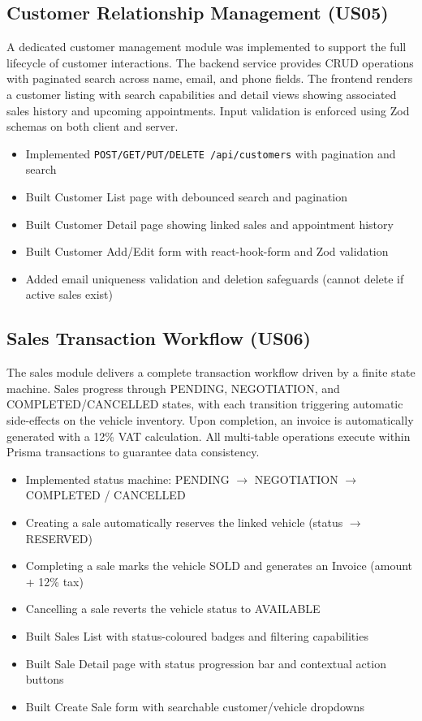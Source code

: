 \documentclass[12pt,a4paper]{article}
\begin{document}
\subsection{Customer Relationship Management (US05)}

A dedicated customer management module was implemented to support the full lifecycle of customer interactions. The backend service provides CRUD operations with paginated search across name, email, and phone fields. The frontend renders a customer listing with search capabilities and detail views showing associated sales history and upcoming appointments. Input validation is enforced using Zod schemas on both client and server.

\begin{itemize}[leftmargin=1.5em, itemsep=4pt]
  \item Implemented \texttt{POST/GET/PUT/DELETE /api/customers} with pagination and search
  \item Built Customer List page with debounced search and pagination
  \item Built Customer Detail page showing linked sales and appointment history
  \item Built Customer Add/Edit form with react-hook-form and Zod validation
  \item Added email uniqueness validation and deletion safeguards (cannot delete if active sales exist)
\end{itemize}

\subsection{Sales Transaction Workflow (US06)}

The sales module delivers a complete transaction workflow driven by a finite state machine. Sales progress through PENDING, NEGOTIATION, and COMPLETED/CANCELLED states, with each transition triggering automatic side-effects on the vehicle inventory. Upon completion, an invoice is automatically generated with a 12\% VAT calculation. All multi-table operations execute within Prisma transactions to guarantee data consistency.

\begin{itemize}[leftmargin=1.5em, itemsep=4pt]
  \item Implemented status machine: PENDING $\rightarrow$ NEGOTIATION $\rightarrow$ COMPLETED / CANCELLED
  \item Creating a sale automatically reserves the linked vehicle (status $\rightarrow$ RESERVED)
  \item Completing a sale marks the vehicle SOLD and generates an Invoice (amount + 12\% tax)
  \item Cancelling a sale reverts the vehicle status to AVAILABLE
  \item Built Sales List with status-coloured badges and filtering capabilities
  \item Built Sale Detail page with status progression bar and contextual action buttons
  \item Built Create Sale form with searchable customer/vehicle dropdowns
\end{itemize}
\end{document}
